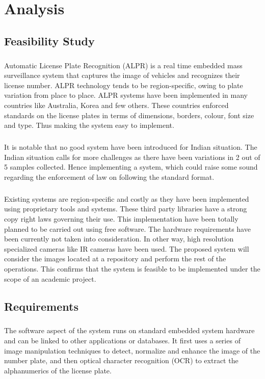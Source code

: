 \documentclass[a4paper,10pt]{iesreport}
\begin{document}
\chapter{Analysis}
\section{Feasibility Study}
\paragraph*{}
Automatic License Plate Recognition (ALPR) is a real time
 embedded mass surveillance system that captures the image
 of vehicles and recognizes their license number.
 ALPR technology tends to be region-specific, owing to plate
 variation from place to place.
 ALPR systems have been implemented in many countries
 like Australia, Korea and few others. These countries enforced standards on the license plates in
 terms of dimensions, borders, colour, font size and type.
 Thus making the system easy to implement.
\paragraph*{}
It is notable that no good system have been introduced for Indian situation. The Indian situation calls for more challenges as there have been variations in 2 out of 5 samples collected.  Hence implementing a system, which could raise some sound regarding the enforcement of law on following the standard format.
\paragraph*{}
Existing systems are region-specific and costly as they have been implemented using proprietary tools and systems. These third party libraries have a strong copy right laws governing their use. This implementation have been totally planned to be carried out using free software. 
The hardware requirements have been currently not taken into consideration. In other way, high resolution specialized cameras like IR cameras have been used. The proposed system will consider the images located at a repository and perform the rest of the operations. This confirms that the system is feasible to be implemented under the scope of an academic project.
\newpage
\section{Requirements}
\paragraph*{}
The software aspect of the system runs on standard embedded system hardware and can be linked to other applications or databases. It first uses a series of image manipulation techniques to detect, normalize and enhance the image of the number plate, and then optical character recognition (OCR) to extract the alphanumerics of the license plate.
\end{document}
